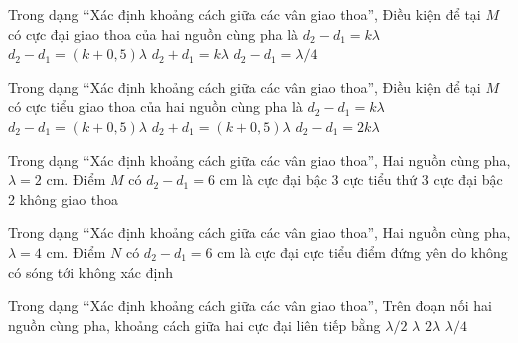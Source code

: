 \begin{ex}
Trong dạng “Xác định khoảng cách giữa các vân giao thoa”, Điều kiện để tại $M$ có cực đại giao thoa của hai nguồn cùng pha là
\choice
{\True $d_2-d_1=k\lambda$}
{$d_2-d_1=(k+0,5)\lambda$}
{$d_2+d_1=k\lambda$}
{$d_2-d_1=\lambda/4$}
\end{ex}

\begin{ex}
Trong dạng “Xác định khoảng cách giữa các vân giao thoa”, Điều kiện để tại $M$ có cực tiểu giao thoa của hai nguồn cùng pha là
\choice
{$d_2-d_1=k\lambda$}
{\True $d_2-d_1=(k+0,5)\lambda$}
{$d_2+d_1=(k+0,5)\lambda$}
{$d_2-d_1=2k\lambda$}
\end{ex}

\begin{ex}
Trong dạng “Xác định khoảng cách giữa các vân giao thoa”, Hai nguồn cùng pha, $\lambda=2$ cm. Điểm $M$ có $d_2-d_1=6$ cm là
\choice
{\True cực đại bậc 3}
{cực tiểu thứ 3}
{cực đại bậc 2}
{không giao thoa}
\end{ex}

\begin{ex}
Trong dạng “Xác định khoảng cách giữa các vân giao thoa”, Hai nguồn cùng pha, $\lambda=4$ cm. Điểm $N$ có $d_2-d_1=6$ cm là
\choice
{cực đại}
{\True cực tiểu}
{điểm đứng yên do không có sóng tới}
{không xác định}
\end{ex}

\begin{ex}
Trong dạng “Xác định khoảng cách giữa các vân giao thoa”, Trên đoạn nối hai nguồn cùng pha, khoảng cách giữa hai cực đại liên tiếp bằng
\choice
{\True $\lambda/2$}
{$\lambda$}
{$2\lambda$}
{$\lambda/4$}
\end{ex}

